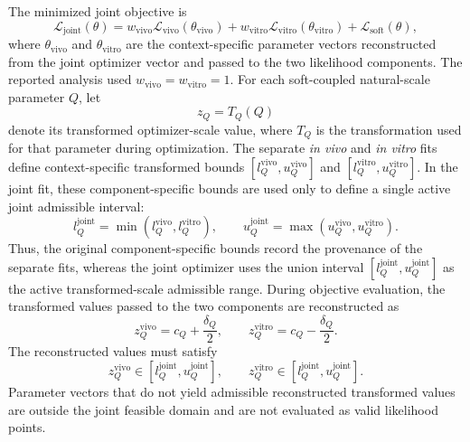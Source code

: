 \documentclass[11pt]{article}
\begin{document}
The minimized joint objective is
\begin{equation}
\mathcal L_{\mathrm{joint}}(\theta) = w_{\mathrm{vivo}}\mathcal L_{\mathrm{vivo}}(\theta_{\mathrm{vivo}}) + w_{\mathrm{vitro}}\mathcal L_{\mathrm{vitro}}(\theta_{\mathrm{vitro}}) + \mathcal L_{\mathrm{soft}}(\theta),
\label{eq:appendix_joint_objective}
\end{equation}
where $\theta_{\mathrm{vivo}}$ and $\theta_{\mathrm{vitro}}$ are the context-specific parameter vectors reconstructed from the joint optimizer vector and passed to the two likelihood components. 
The reported analysis used $w_{\mathrm{vivo}}=w_{\mathrm{vitro}}=1$.
For each soft-coupled natural-scale parameter $Q$, let
\[
z_Q=T_Q(Q)
\]
denote its transformed optimizer-scale value, where $T_Q$ is the transformation used for that parameter during optimization. The separate \textit{in vivo} and \textit{in vitro} fits define context-specific transformed bounds $[l_Q^{\mathrm{vivo}},u_Q^{\mathrm{vivo}}]$ and $[l_Q^{\mathrm{vitro}},u_Q^{\mathrm{vitro}}]$. In the joint fit, these component-specific bounds are used only to define a single active joint admissible interval:
\begin{equation}
l_Q^{\mathrm{joint}} = \min\!\left(l_Q^{\mathrm{vivo}},l_Q^{\mathrm{vitro}}\right), \qquad u_Q^{\mathrm{joint}} = \max\!\left(u_Q^{\mathrm{vivo}},u_Q^{\mathrm{vitro}}\right).
\label{eq:appendix_joint_union_bounds}
\end{equation}
Thus, the original component-specific bounds record the provenance of the separate fits, whereas the joint optimizer uses the union interval $[l_Q^{\mathrm{joint}},u_Q^{\mathrm{joint}}]$ as the active transformed-scale admissible range.
During objective evaluation, the transformed values passed to the two components are reconstructed as
\begin{equation}
z^{\mathrm{vivo}}_Q = c_Q+\frac{\delta_Q}{2}, \qquad z^{\mathrm{vitro}}_Q = c_Q-\frac{\delta_Q}{2}.
\label{eq:appendix_joint_center_delta_split}
\end{equation}
The reconstructed values must satisfy
\begin{equation}
z_Q^{\mathrm{vivo}}\in [l_Q^{\mathrm{joint}},u_Q^{\mathrm{joint}}], \qquad z_Q^{\mathrm{vitro}}\in [l_Q^{\mathrm{joint}},u_Q^{\mathrm{joint}}].
\label{eq:appendix_joint_reconstructed_bounds}
\end{equation}
Parameter vectors that do not yield admissible reconstructed transformed values are outside the joint feasible domain and are not evaluated as valid likelihood points.
\end{document}
